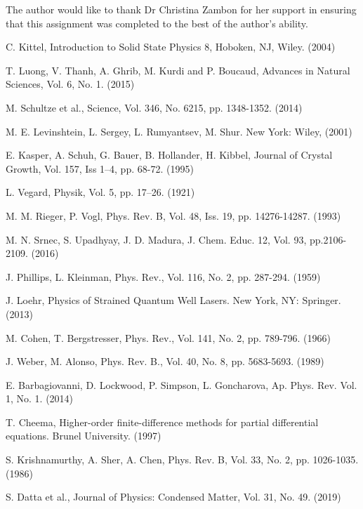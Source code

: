 \documentclass[10pt, twocolumn]{revtex4}    %
\begin{document}
 \begin{acknowledgements}
 The author would like to thank Dr Christina Zambon for her support in ensuring that this assignment was completed to the best of the author's ability.
 \end{acknowledgements}


\begin{thebibliography}{}

C. Kittel, Introduction to Solid State Physics 8, Hoboken, NJ, Wiley.  (2004)   %

T. Luong, V. Thanh, A. Ghrib, M. Kurdi and P. Boucaud, Advances in Natural Sciences, Vol. 6, No. 1. (2015)

M. Schultze et al., Science, Vol. 346, No. 6215, pp. 1348-1352. (2014)

M. E. Levinshtein, L. Sergey, L. Rumyantsev, M. Shur. New York: Wiley, (2001)

E. Kasper, A. Schuh, G. Bauer, B. Hollander, H. Kibbel, Journal of Crystal Growth,
Vol. 157, Iss 1–4, pp. 68-72. (1995)

L. Vegard, Physik, Vol. 5, pp. 17–26. (1921)

M. M.  Rieger, P. Vogl, Phys. Rev. B, Vol. 48, Iss. 19, pp. 14276-14287. (1993)

M. N. Srnec, S. Upadhyay, J. D.  Madura, J. Chem. Educ. 12, Vol. 93, pp.2106-2109. (2016)

J. Phillips, L. Kleinman, Phys. Rev., Vol. 116, No. 2, pp. 287-294. (1959)

J. Loehr, Physics of Strained Quantum Well Lasers. New York, NY: Springer. (2013)

M. Cohen, T. Bergstresser, Phys. Rev., Vol. 141, No. 2, pp. 789-796. (1966)

J. Weber, M. Alonso, Phys. Rev. B., Vol. 40, No. 8, pp. 5683-5693. (1989)

E. Barbagiovanni, D. Lockwood, P. Simpson, L. Goncharova, Ap. Phys. Rev. Vol. 1, No. 1. (2014)

T. Cheema, Higher-order finite-difference methods for partial differential equations. Brunel University. (1997)

S. Krishnamurthy, A. Sher, A. Chen, Phys. Rev. B, Vol. 33, No. 2, pp. 1026-1035. (1986)

S. Datta et al., Journal of Physics: Condensed Matter, Vol. 31, No. 49. (2019)


\end{thebibliography}
\end{document}
